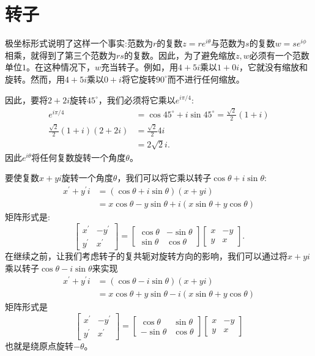 \section{转子}
极坐标形式说明了这样一个事实:范数为$r$的复数$z=r e^{i \theta}$与范数为$s$的复数$w=s e^{i \phi}$相乘，就得到了第三个范数为$r s$的复数。因此，为了避免缩放$z, w$必须有一个范数单位$1$。在这种情况下，$w$充当转子。例如，用$4+5 i$乘以$1+0 i$，它就没有缩放和旋转。然而，用$4+5 i$乘以$0+i$将它旋转$90^{\circ}$而不进行任何缩放。

因此，要将$2+2 i$旋转$45^{\circ}$，我们必须将它乘以$e^{i \pi / 4}$:
$$
\begin{aligned}
e^{i \pi / 4} & =\cos 45^{\circ}+i \sin 45^{\circ}=\frac{\sqrt{2}}{2}(1+i) \\
\frac{\sqrt{2}}{2}(1+i)(2+2 i) & =\frac{\sqrt{2}}{2} 4 i \\
& =2 \sqrt{2} i .
\end{aligned}
$$
因此$e^{i \theta}$将任何复数旋转一个角度$\theta$。

要使复数$x+y i$旋转一个角度$\theta$，我们可以将它乘以转子$\cos \theta+i \sin \theta$:
$$
\begin{aligned}
x^{\prime}+y^{\prime} i & =(\cos \theta+i \sin \theta)(x+y i) \\
& =x \cos \theta-y \sin \theta+i(x \sin \theta+y \cos \theta)
\end{aligned}
$$
矩阵形式是:
$$
\left[\begin{array}{cc}
x^{\prime} & -y^{\prime} \\
y^{\prime} & x^{\prime}
\end{array}\right]=\left[\begin{array}{cc}
\cos \theta & -\sin \theta \\
\sin \theta & \cos \theta
\end{array}\right]\left[\begin{array}{cc}
x & -y \\
y & x
\end{array}\right] .
$$
在继续之前，让我们考虑转子的复共轭对旋转方向的影响，我们可以通过将$x+y i$乘以转子$\cos \theta -i \sin \theta$来实现
$$
\begin{aligned}
x^{\prime}+y^{\prime} i & =(\cos \theta-i \sin \theta)(x+y i) \\
& =x \cos \theta+y \sin \theta-i(x \sin \theta+y \cos \theta)
\end{aligned}
$$
矩阵形式是
$$
\left[\begin{array}{cc}
x^{\prime} & -y^{\prime} \\
y^{\prime} & x^{\prime}
\end{array}\right]=\left[\begin{array}{cc}
\cos \theta & \sin \theta \\
-\sin \theta & \cos \theta
\end{array}\right]\left[\begin{array}{cc}
x & -y \\
y & x
\end{array}\right]
$$
也就是绕原点旋转$-\theta$。

